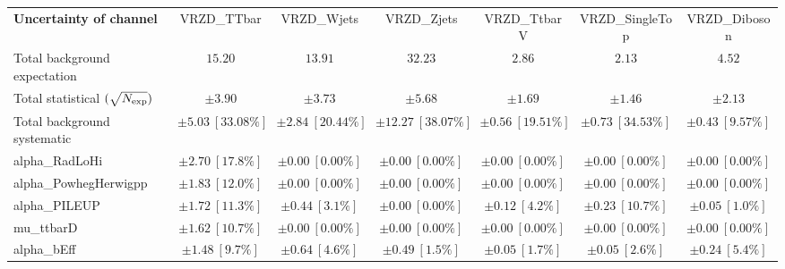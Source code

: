 
\begin{sidewaystable}
\begin{center}
\setlength{\tabcolsep}{0.0pc}
\begin{tabular*}{\textwidth}{@{\extracolsep{\fill}}lcccccc}
\noalign{\smallskip}\hline\noalign{\smallskip}
{\bf Uncertainty of channel}                                    & VRZD\_TTbar            & VRZD\_Wjets            & VRZD\_Zjets            & VRZD\_TtbarV            & VRZD\_SingleTop            & VRZD\_Diboson            \\
\noalign{\smallskip}\hline\noalign{\smallskip}
Total background expectation             &  $15.20$        &  $13.91$        &  $32.23$        &  $2.86$        &  $2.13$        &  $4.52$       \\
\noalign{\smallskip}\hline\noalign{\smallskip}
Total statistical $(\sqrt{N_{\rm exp}})$              & $\pm 3.90$        & $\pm 3.73$        & $\pm 5.68$        & $\pm 1.69$        & $\pm 1.46$        & $\pm 2.13$       \\
Total background systematic               & $\pm 5.03\ [33.08\%] $        & $\pm 2.84\ [20.44\%] $        & $\pm 12.27\ [38.07\%] $        & $\pm 0.56\ [19.51\%] $        & $\pm 0.73\ [34.53\%] $        & $\pm 0.43\ [9.57\%] $             \\
\noalign{\smallskip}\hline\noalign{\smallskip}
\noalign{\smallskip}\hline\noalign{\smallskip}
alpha\_RadLoHi         & $\pm 2.70\ [17.8\%] $          & $\pm 0.00\ [0.00\%] $          & $\pm 0.00\ [0.00\%] $          & $\pm 0.00\ [0.00\%] $          & $\pm 0.00\ [0.00\%] $          & $\pm 0.00\ [0.00\%] $       \\
alpha\_PowhegHerwigpp         & $\pm 1.83\ [12.0\%] $          & $\pm 0.00\ [0.00\%] $          & $\pm 0.00\ [0.00\%] $          & $\pm 0.00\ [0.00\%] $          & $\pm 0.00\ [0.00\%] $          & $\pm 0.00\ [0.00\%] $       \\
alpha\_PILEUP         & $\pm 1.72\ [11.3\%] $          & $\pm 0.44\ [3.1\%] $          & $\pm 0.00\ [0.00\%] $          & $\pm 0.12\ [4.2\%] $          & $\pm 0.23\ [10.7\%] $          & $\pm 0.05\ [1.0\%] $       \\
mu\_ttbarD         & $\pm 1.62\ [10.7\%] $          & $\pm 0.00\ [0.00\%] $          & $\pm 0.00\ [0.00\%] $          & $\pm 0.00\ [0.00\%] $          & $\pm 0.00\ [0.00\%] $          & $\pm 0.00\ [0.00\%] $       \\
alpha\_bEff         & $\pm 1.48\ [9.7\%] $          & $\pm 0.64\ [4.6\%] $          & $\pm 0.49\ [1.5\%] $          & $\pm 0.05\ [1.7\%] $          & $\pm 0.05\ [2.6\%] $          & $\pm 0.24\ [5.4\%] $       \\

\end{tabular*}
\end{center}
\end{sidewaystable}
